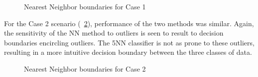 \documentclass[article, 1.5space, letterpaper, 12pt, oneside, header, footer]{SydeClass}
\begin{document}
\begin{figure}[ht]
\centering
	
	\caption{Nearest Neighbor boundaries for Case 1}
	\label{fig:nn_boundary_case1}
\end{figure}

For the Case 2 scenario (~\ref{fig:nn_boundary_case2}), performance of the two methods was similar. Again, the sensitivity of the NN method to outliers is seen to result to decision boundaries encircling outliers. The 5NN classifier is not as prone to these outliers, resulting in a more intuitive decision boundary between the three classes of data.

\begin{figure}[ht]
\centering
	
	\caption{Nearest Neighbor boundaries for Case 2}
	\label{fig:nn_boundary_case2}
\end{figure}
\end{document}
